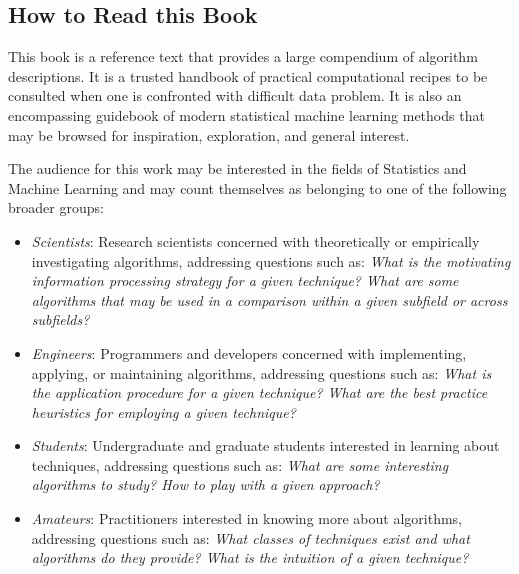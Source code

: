 \subsection{How to Read this Book}
This book is a reference text that provides a large compendium of algorithm descriptions. 
It is a trusted handbook of practical computational recipes to be consulted when one is confronted with difficult data problem. It is also an encompassing guidebook of modern statistical machine learning methods that may be browsed for inspiration, exploration, and general interest.

The audience for this work may be interested in the fields of Statistics and Machine Learning and may count themselves as belonging to one of the following broader groups:

\begin{itemize}
	\item \emph{Scientists}: Research scientists concerned with theoretically or empirically investigating algorithms, addressing questions such as: \emph{What is the motivating information processing strategy for a given technique? What are some algorithms that may be used in a comparison within a given subfield or across subfields?}
	\item \emph{Engineers}: Programmers and developers concerned with implementing, applying, or maintaining algorithms, addressing questions such as: \emph{What is the application procedure for a given technique? What are the best practice heuristics for employing a given technique?}
	\item \emph{Students}: Undergraduate and graduate students interested in learning about techniques, addressing questions such as: \emph{What are some interesting algorithms to study? How to play with a given approach?}
	\item \emph{Amateurs}: Practitioners interested in knowing more about algorithms, addressing questions such as: \emph{What classes of techniques exist and what algorithms do they provide? What is the intuition of a given technique?}
\end{itemize}

